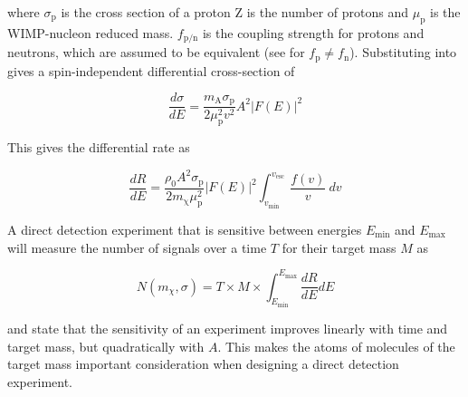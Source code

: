 \noindent where $\sigma_{\mathrm{p}}$ is the cross section of a proton Z is the number of protons and $\mu_{\mathrm{p}}$ is
the WIMP-nucleon reduced mass. $f_{\mathrm{p/n}}$ is the coupling strength for protons and neutrons, which are assumed to be
equivalent (see  for $f_{\mathrm{p}} \neq f_{\mathrm{n}}$).  Substituting  into
 gives a spin-independent differential cross-section of

\begin{equation}
\frac{d \sigma}{dE} = \frac{m_{\mathrm{A}} \sigma_{\mathrm{p}}}{2 \mu_{\mathrm{p}}^{2} v^{2}}
 A^{2} \big| F(E) \big |^{2}
\end{equation}

\noindent This gives the differential rate as 

\begin{equation}
\frac{dR}{dE} = \frac{\rho_{0} A^{2} \sigma_{\mathrm{p}}}{2 m_{\mathrm{\chi}} \mu_{\mathrm{p}}^{2}}
  \big| F(E) \big |^{2} \int_{v_{\mathrm{min}}}^{v_{\mathrm{esc}}}
\frac{f(v)}{v}\ dv
\label{eq:dr_de_final}
\end{equation}

\noindent A direct detection experiment that is sensitive between energies $E_{\mathrm{min}}$ and $E_{\mathrm{max}}$ will measure
the number of signals over a time $T$ for their target mass $M$ as

\begin{equation} \label{eq:counts}
N ( m_{\chi}, \sigma) = T \times M \times \int_{E_{\mathrm{min}}}^{E_{\mathrm{max}}} \frac{dR}{dE} dE
\end{equation}

\noindent {} and  state that the sensitivity of an experiment improves linearly with time and
target mass, but quadratically with $A$.  This makes the atoms of molecules of the target mass important consideration when
designing a direct detection experiment.







